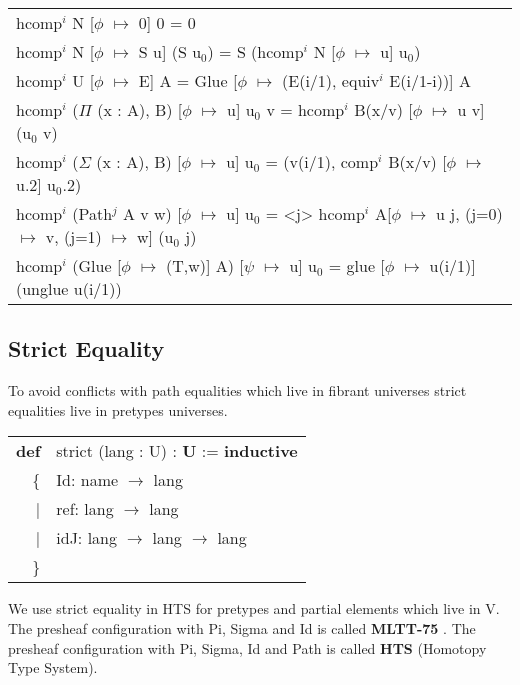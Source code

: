 \documentclass{article}
\theoremstyle{definition}
\newcommand{\tabstyle}[0]{\scriptsize\ttfamily\fontseries{l}\selectfont}
\begin{document}
\begin{table}[ht]
\tabstyle
\begin{tabular}{l}
hcomp$^i$ N [$\phi$ $\mapsto$ 0] 0 = 0 \\
hcomp$^i$ N [$\phi$ $\mapsto$ S u] (S u$_0$) = S (hcomp$^i$ N [$\phi$ $\mapsto$ u] u$_0$) \\
hcomp$^i$ U [$\phi$ $\mapsto$ E] A = Glue [$\phi$ $\mapsto$ (E(i/1), equiv$^i$ E(i/1-i))] A \\
hcomp$^i$ ($\Pi$ (x : A), B) [$\phi$ $\mapsto$ u] u$_0$ v = hcomp$^i$ B(x/v) [$\phi$ $\mapsto$ u v] (u$_0$ v) \\
hcomp$^i$ ($\Sigma$ (x : A), B) [$\phi$ $\mapsto$ u] u$_0$ = (v(i/1), comp$^i$ B(x/v) [$\phi$ $\mapsto$ u.2] u$_0$.2) \\
hcomp$^i$ (Path$^j$ A v w) [$\phi$ $\mapsto$ u] u$_0$ = <j> hcomp$^i$ A[$\phi$ $\mapsto$ u j, (j=0) $\mapsto$ v, (j=1) $\mapsto$ w] (u$_0$ j) \\
hcomp$^i$ (Glue [$\phi$ $\mapsto$ (T,w)] A) [$\psi$ $\mapsto$ u] u$_0$ = glue [$\phi$ $\mapsto$ u(i/1)] (unglue u(i/1)) \\
\end{tabular}
\end{table}

\subsection{Strict Equality}

To avoid conflicts with path equalities which live in fibrant universes strict
equalities live in pretypes universes.

\begin{table}[ht!]
\tabstyle
\begin{tabular}{rl}
     \textbf{def} & strict (lang : U) : \textbf{U} := \textbf{inductive} \\\
 \{ & Id: name $\rightarrow$ lang \\
  |& ref: lang $\rightarrow$ lang \\
  |& idJ: lang $\rightarrow$ lang $\rightarrow$ lang \\
                         \} & \\
\end{tabular}
\end{table}

We use strict equality in HTS for pretypes and partial elements which live in V.
The presheaf configuration with Pi, Sigma and Id is called \textbf{MLTT-75} \cite{MLTT75}. The presheaf
configuration with Pi, Sigma, Id and Path is called \textbf{HTS} (Homotopy Type System).
\end{document}
